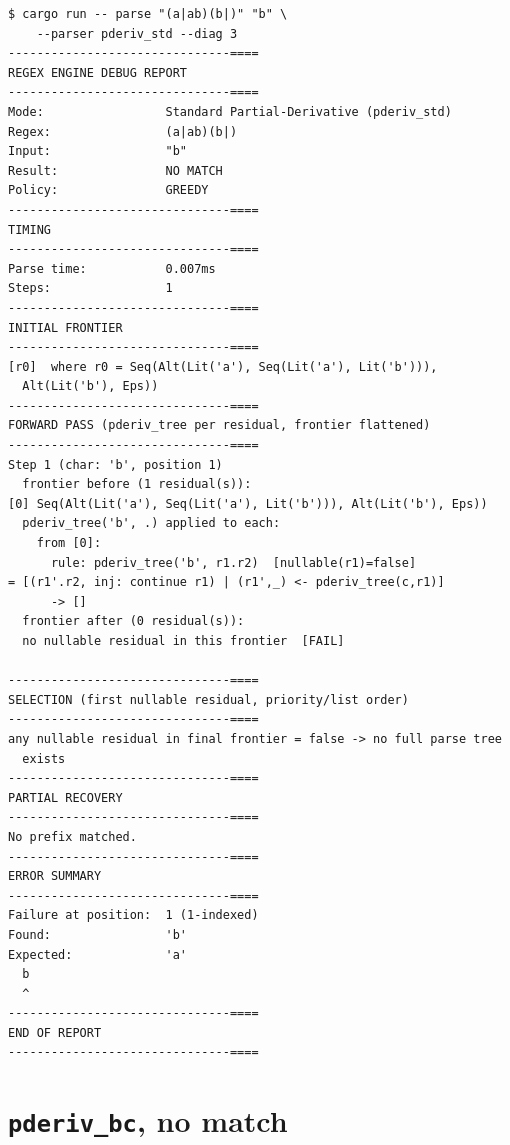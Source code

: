\begin{verbatim}
$ cargo run -- parse "(a|ab)(b|)" "b" \
    --parser pderiv_std --diag 3
-------------------------------====
REGEX ENGINE DEBUG REPORT
-------------------------------====
Mode:                 Standard Partial-Derivative (pderiv_std)
Regex:                (a|ab)(b|)
Input:                "b"
Result:               NO MATCH
Policy:               GREEDY
-------------------------------====
TIMING
-------------------------------====
Parse time:           0.007ms
Steps:                1
-------------------------------====
INITIAL FRONTIER
-------------------------------====
[r0]  where r0 = Seq(Alt(Lit('a'), Seq(Lit('a'), Lit('b'))),
  Alt(Lit('b'), Eps))
-------------------------------====
FORWARD PASS (pderiv_tree per residual, frontier flattened)
-------------------------------====
Step 1 (char: 'b', position 1)
  frontier before (1 residual(s)):
[0] Seq(Alt(Lit('a'), Seq(Lit('a'), Lit('b'))), Alt(Lit('b'), Eps))
  pderiv_tree('b', .) applied to each:
    from [0]:
      rule: pderiv_tree('b', r1.r2)  [nullable(r1)=false]
= [(r1'.r2, inj: continue r1) | (r1',_) <- pderiv_tree(c,r1)]
      -> []
  frontier after (0 residual(s)):
  no nullable residual in this frontier  [FAIL]

-------------------------------====
SELECTION (first nullable residual, priority/list order)
-------------------------------====
any nullable residual in final frontier = false -> no full parse tree
  exists
-------------------------------====
PARTIAL RECOVERY
-------------------------------====
No prefix matched.
-------------------------------====
ERROR SUMMARY
-------------------------------====
Failure at position:  1 (1-indexed)
Found:                'b'
Expected:             'a'
  b
  ^
-------------------------------====
END OF REPORT
-------------------------------====
\end{verbatim}

\section{\texttt{pderiv\_bc}, no match}
\label{app:report-pderiv-bc-nomatch}

